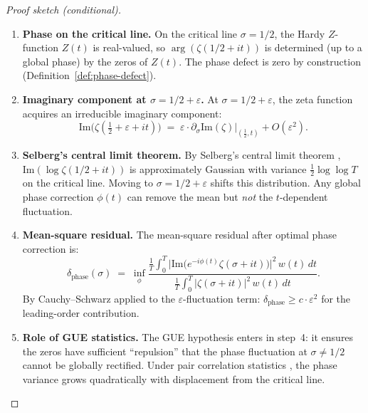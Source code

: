 \documentclass[11pt]{article}
\theoremstyle{definition}
\begin{document}
\begin{proof}[Proof sketch (conditional)]
\begin{enumerate}
  \item \textbf{Phase on the critical line.}
    On the critical line $\sigma = 1/2$, the Hardy $Z$-function
    $Z(t)$ is real-valued, so $\arg(\zeta(1/2 + it))$ is determined
    (up to a global phase) by the zeros of $Z(t)$.  The phase defect
    is zero by construction (Definition~\ref{def:phase-defect}).

  \item \textbf{Imaginary component at $\sigma = 1/2 + \varepsilon$.}
    At $\sigma = 1/2 + \varepsilon$, the zeta function acquires an
    irreducible imaginary component:
    \[
      \mathrm{Im}\bigl(\zeta(\tfrac{1}{2} + \varepsilon + it)\bigr)
      \;=\; \varepsilon \cdot \partial_\sigma
        \mathrm{Im}(\zeta)\big|_{(\frac{1}{2}, t)}
      + O(\varepsilon^2).
    \]

  \item \textbf{Selberg's central limit theorem.}
    By Selberg's central limit theorem \cite{Sel},
    $\mathrm{Im}(\log \zeta(1/2 + it))$ is approximately Gaussian
    with variance $\tfrac{1}{2}\log\log T$ on the critical line.
    Moving to $\sigma = 1/2 + \varepsilon$ shifts this distribution.
    Any global phase correction $\phi(t)$ can remove the mean but
    \emph{not} the $t$-dependent fluctuation.

  \item \textbf{Mean-square residual.}
    The mean-square residual after optimal phase correction is:
    \[
      \delta_{\mathrm{phase}}(\sigma)
      \;=\; \inf_{\phi}
      \frac{\frac{1}{T}\int_0^T
        \bigl|\mathrm{Im}\bigl(e^{-i\phi(t)} \zeta(\sigma + it)\bigr)\bigr|^2
        \, w(t)\, dt}
      {\frac{1}{T}\int_0^T |\zeta(\sigma + it)|^2 \, w(t)\, dt}.
    \]
    By Cauchy--Schwarz applied to the $\varepsilon$-fluctuation term:
    $\delta_{\mathrm{phase}} \geq c \cdot \varepsilon^2$ for the
    leading-order contribution.

  \item \textbf{Role of GUE statistics.}
    The GUE hypothesis enters in step~4: it ensures the zeros have
    sufficient ``repulsion'' that the phase fluctuation at
    $\sigma \neq 1/2$ cannot be globally rectified.  Under pair
    correlation statistics \cite{Mont}, the phase variance grows
    quadratically with displacement from the critical line.
\end{enumerate}
\end{proof}
\end{document}
